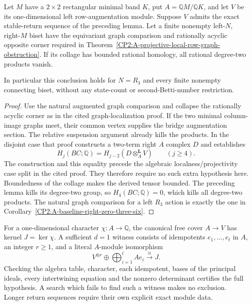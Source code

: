 \begin{theorem}
\label{CP2:A-stable-syzygy-row-graph-obstruction}
Let $M$ have a $2\times2$ rectangular minimal band $K$,
put $A=\mathbb QM/\mathbb QK$, and let $V$ be its
one-dimensional left row-augmentation module.  Suppose $V$
admits the exact stable-return sequence of the preceding lemma.
Let a finite nonempty left-$N$, right-$M$ biset have the
equivariant graph comparison and rationally acyclic opposite
corner required in
Theorem~\ref{CP2:A-projective-local-row-graph-obstruction}.
If its collage has bounded rational homology, all rational
degree-two products vanish.

In particular this conclusion holds for $N=R_3$ and every
finite nonempty connecting biset, without any state-count
or second-Betti-number restriction.
\end{theorem}
\begin{proof}
Use the natural augmented graph comparison and collapse the
rationally acyclic corner as in the cited graph-localization
proof.  If the two minimal column-image graphs meet, their
common vertex supplies the bridge augmentation section.
The relative suspension argument already kills the products.
In the disjoint case that proof constructs a two-term right
$A$ complex $D$ and establishes
\[
 H_j(BC;\mathbb Q)=H_{j-2}(D\otimes_A^{\mathbf L}V)
                         \qquad(j\ge4).
\]
The construction and this equality precede the algebraic
localness/projectivity case split in the cited proof.  They
therefore require no such extra hypothesis here.  Boundedness
of the collage makes the derived tensor bounded.  The preceding
lemma kills its degree-two group, so $H_4(BC;\mathbb Q)=0$,
which kills all degree-two products.
The natural graph comparison for a left $R_3$ action is exactly
the one in Corollary~\ref{CP2:A-baseline-right-zero-three-six}.
\end{proof}

\begin{remark*}
For a one-dimensional character $\chi:A\to\mathbb Q$, the
canonical free cover $A\to V$ has kernel $J=\ker\chi$.
A sufficient $d=1$ witness consists of idempotents $e_1,\ldots,e_t$
in $A$, an integer $r\ge1$, and a literal $A$-module isomorphism
\[
 V^{\oplus r}\oplus\bigoplus_{i=1}^t Ae_i
                  \xrightarrow{\cong}J.
\]
Checking the algebra table, character, each idempotent, bases
of the principal ideals, every intertwining equation and the
nonzero determinant certifies the full hypothesis.  A search
which fails to find such a witness makes no exclusion.  Longer
return sequences require their own explicit exact module data.
\end{remark*}
